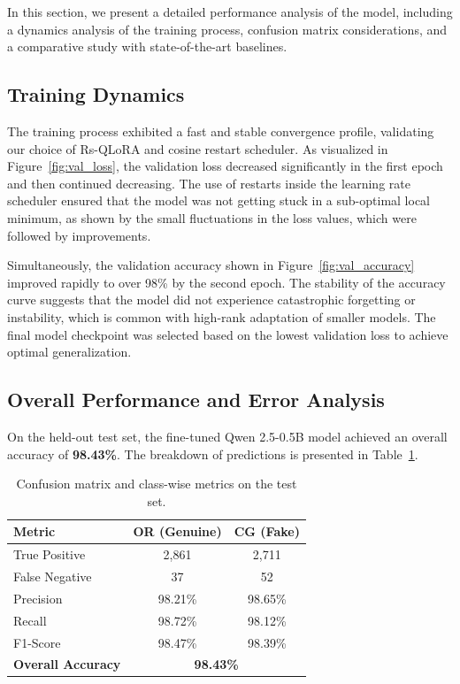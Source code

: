 \documentclass[utf8]{FrontiersinHarvard}
\begin{document}
In this section, we present a detailed performance analysis of the model, including a dynamics analysis of the training process, confusion matrix considerations, and a comparative study with state-of-the-art baselines.

\subsection{Training Dynamics}

The training process exhibited a fast and stable convergence profile, validating our choice of Rs-QLoRA and cosine restart scheduler. As visualized in Figure~\ref{fig:val_loss}, the validation loss decreased significantly in the first epoch and then continued decreasing. The use of restarts inside the learning rate scheduler ensured that the model was not getting stuck in a sub-optimal local minimum, as shown by the small fluctuations in the loss values, which were followed by improvements.

Simultaneously, the validation accuracy shown in Figure~\ref{fig:val_accuracy} improved rapidly to over 98\% by the second epoch. The stability of the accuracy curve suggests that the model did not experience catastrophic forgetting or instability, which is common with high-rank adaptation of smaller models. The final model checkpoint was selected based on the lowest validation loss to achieve optimal generalization.

\subsection{Overall Performance and Error Analysis}

On the held-out test set, the fine-tuned Qwen 2.5-0.5B model achieved an overall accuracy of \textbf{98.43\%}. The breakdown of predictions is presented in Table~\ref{tab:confusion}.

\begin{table}[htbp]
\caption{Confusion matrix and class-wise metrics on the test set.}\label{tab:confusion}
\centering
\begin{tabular}{lcc}
\toprule
\textbf{Metric} & \textbf{OR (Genuine)} & \textbf{CG (Fake)} \\
\midrule
True Positive  & 2,861  & 2,711 \\
False Negative & 37     & 52    \\
Precision      & 98.21\% & 98.65\% \\
Recall         & 98.72\% & 98.12\% \\
F1-Score       & 98.47\% & 98.39\% \\
\midrule
\textbf{Overall Accuracy} & \multicolumn{2}{c}{\textbf{98.43\%}} \\
\bottomrule
\end{tabular}
\end{table}
\end{document}
